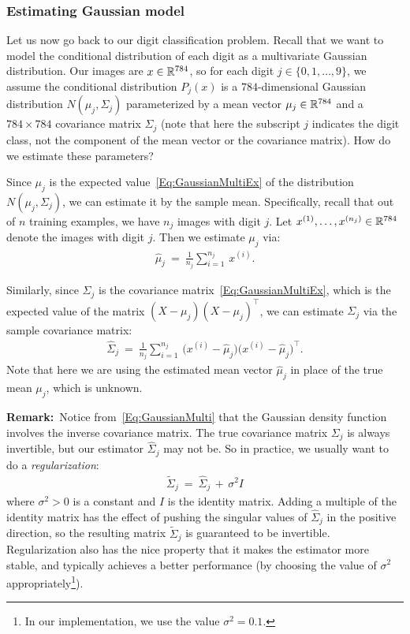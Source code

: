\documentclass[11pt]{article}
\begin{document}
\subsubsection*{Estimating Gaussian model}

Let us now go back to our digit classification problem. Recall that we want to model the conditional distribution of each digit as a multivariate Gaussian distribution. Our images are $x \in \mathbb{R}^{784}$, so for each digit $j \in \{0,1,\dots,9\}$, we assume the conditional distribution $P_j(x)$ is a $784$-dimensional Gaussian distribution $N(\mu_j, \Sigma_j)$ parameterized by a mean vector $\mu_j \in \mathbb{R}^{784}$ and a $784 \times 784$ covariance matrix $\Sigma_j$ (note that here the subscript $j$ indicates the digit class, not the component of the mean vector or the covariance matrix). How do we estimate these parameters?

Since $\mu_j$ is the expected value~\eqref{Eq:GaussianMultiEx} of the distribution $N(\mu_j, \Sigma_j)$, we can estimate it by the sample mean. Specifically, recall that out of $n$ training examples, we have $n_j$ images with digit $j$. Let $x^{(1)}, \dots, x^{(n_j)} \in \mathbb{R}^{784}$ denote the images with digit $j$. Then we estimate $\mu_j$ via:
\begin{align}\label{Eq:Muj}
\hat \mu_j ~=~ \frac{1}{n_j} \sum_{i=1}^{n_j} \, x^{(i)}.
\end{align}

Similarly, since $\Sigma_j$ is the covariance matrix~\eqref{Eq:GaussianMultiEx}, which is the expected value of the matrix $(X - \mu_j)(X - \mu_j)^\top$, we can estimate $\Sigma_j$ via the sample covariance matrix:
\begin{align}\label{Eq:Sigmaj}
\hat \Sigma_j ~=~ \frac{1}{n_j} \sum_{i=1}^{n_j} \, \big(x^{(i)} - \hat \mu_j \big) \big(x^{(i)} - \hat \mu_j \big)^\top.
\end{align}
Note that here we are using the estimated mean vector $\hat \mu_j$ in place of the true mean $\mu_j$, which is unknown.

\smallskip
{\bf Remark:}~Notice from~\eqref{Eq:GaussianMulti} that the Gaussian density function involves the inverse covariance matrix. The true covariance matrix $\Sigma_j$ is always invertible, but our estimator $\hat \Sigma_j$ may not be. So in practice, we usually want to do a {\em regularization}:
\begin{align}\label{Eq:SigmajReg}
\tilde \Sigma_j ~=~ \hat \Sigma_j \,+\, \sigma^2 I
\end{align}
where $\sigma^2 > 0$ is a constant and $I$ is the identity matrix. Adding a multiple of the identity matrix has the effect of pushing the singular values of $\hat \Sigma_j$ in the positive direction, so the resulting matrix $\tilde \Sigma_j$ is guaranteed to be invertible. Regularization also has the nice property that it makes the estimator more stable, and typically achieves a better performance (by choosing the value of $\sigma^2$ appropriately\footnote{In our implementation, we use the value $\sigma^2 = 0.1$.}).
\end{document}
